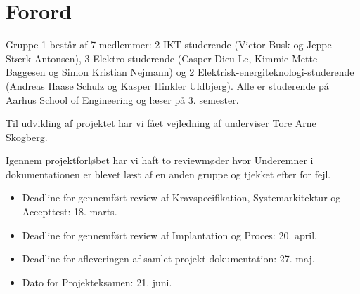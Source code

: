 \chapter{Forord}

Gruppe 1 består af 7 medlemmer: 2 IKT-studerende (Victor Busk og Jeppe Stærk Antonsen), 3 Elektro-studerende (Casper Dieu Le, Kimmie Mette Baggesen og Simon Kristian Nejmann) og 2 Elektrisk-energiteknologi-studerende (Andreas Haase Schulz og Kasper Hinkler Uldbjerg). Alle er studerende på Aarhus School of Engineering og læser på 3. semester.

Til udvikling af projektet har vi fået vejledning af underviser Tore Arne Skogberg.

Igennem projektforløbet har vi haft to reviewmøder hvor Underemner i dokumentationen er blevet læst af en anden gruppe og tjekket efter for fejl.

\begin{itemize}
    \item Deadline for gennemført review af Kravspecifikation, Systemarkitektur og Accepttest: 18. marts.
    \item Deadline for gennemført review af Implantation og Proces: 20. april.
    \item Deadline for afleveringen af samlet projekt-dokumentation: 27. maj.
    \item Dato for Projekteksamen: 21. juni.
\end{itemize}